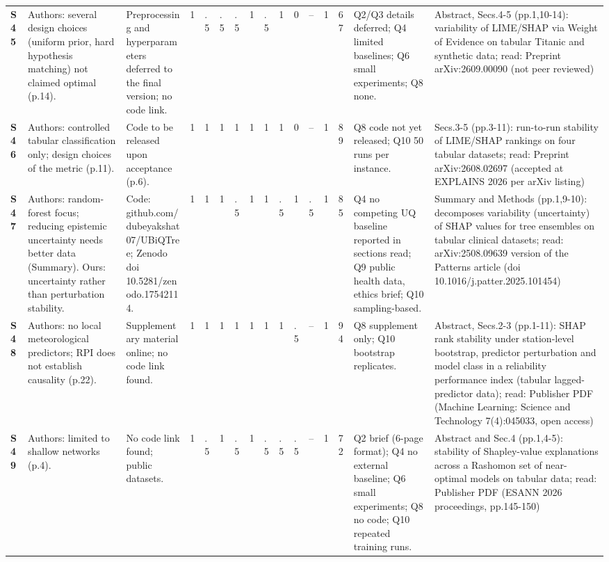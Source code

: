 \begin{longtable}{@{}P{1.0cm}P{4.6cm}P{3.6cm}P{0.3cm}P{0.3cm}P{0.3cm}P{0.3cm}P{0.3cm}P{0.3cm}P{0.3cm}P{0.3cm}P{0.3cm}P{0.36cm}P{0.75cm}P{3.0cm}P{3.9cm}@{}}
\textbf{S45} & Authors: several design choices (uniform prior, hard hypothesis matching) not claimed optimal (p.14). & Preprocessing and hyperparameters deferred to the final version; no code link. & 1 & .5 & .5 & .5 & 1 & .5 & 1 & 0 & -- & 1 & 67 & Q2/\allowbreak{}Q3 details deferred; Q4 limited baselines; Q6 small experiments; Q8 none. & Abstract, Secs.4-5 (pp.1,10-14): variability of LIME/\allowbreak{}SHAP via Weight of Evidence on tabular Titanic and synthetic data; read: Preprint arXiv:2609.00090 (not peer reviewed) \\
\textbf{S46} & Authors: controlled tabular classification only; design choices of the metric (p.11). & Code to be released upon acceptance (p.6). & 1 & 1 & 1 & 1 & 1 & 1 & 1 & 0 & -- & 1 & 89 & Q8 code not yet released; Q10 50 runs per instance. & Secs.3-5 (pp.3-11): run-to-run stability of LIME/\allowbreak{}SHAP rankings on four tabular datasets; read: Preprint arXiv:2608.02697 (accepted at EXPLAINS 2026 per arXiv listing) \\
\textbf{S47} & Authors: random-forest focus; reducing epistemic uncertainty needs better data (Summary). Ours: uncertainty rather than perturbation stability. & Code: github.com/\allowbreak{}dubeyakshat07/\allowbreak{}UBiQTree; Zenodo doi 10.5281/\allowbreak{}zenodo.17542114. & 1 & 1 & 1 & .5 & 1 & 1 & .5 & 1 & .5 & 1 & 85 & Q4 no competing UQ baseline reported in sections read; Q9 public health data, ethics brief; Q10 sampling-based. & Summary and Methods (pp.1,9-10): decomposes variability (uncertainty) of SHAP values for tree ensembles on tabular clinical datasets; read: arXiv:2508.09639 version of the Patterns article (doi 10.1016/\allowbreak{}j.patter.2025.101454) \\
\textbf{S48} & Authors: no local meteorological predictors; RPI does not establish causality (p.22). & Supplementary material online; no code link found. & 1 & 1 & 1 & 1 & 1 & 1 & 1 & .5 & -- & 1 & 94 & Q8 supplement only; Q10 bootstrap replicates. & Abstract, Secs.2-3 (pp.1-11): SHAP rank stability under station-level bootstrap, predictor perturbation and model class in a reliability performance index (tabular lagged-predictor data); read: Publisher PDF (Machine Learning: Science and Technology 7(4):045033, open access) \\
\textbf{S49} & Authors: limited to shallow networks (p.4). & No code link found; public datasets. & 1 & .5 & 1 & .5 & 1 & .5 & .5 & .5 & -- & 1 & 72 & Q2 brief (6-page format); Q4 no external baseline; Q6 small experiments; Q8 no code; Q10 repeated training runs. & Abstract and Sec.4 (pp.1,4-5): stability of Shapley-value explanations across a Rashomon set of near-optimal models on tabular data; read: Publisher PDF (ESANN 2026 proceedings, pp.145-150) \\

\end{longtable}

